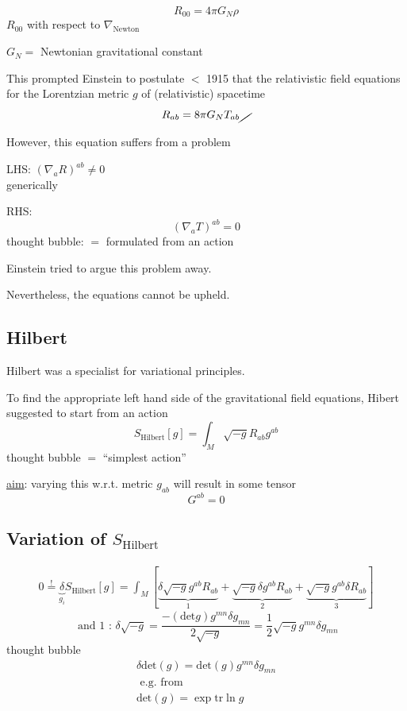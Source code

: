 	\[
	R_{00} = 4\pi G_N \rho
	\]
	$R_{00}$ with respect to $\nabla_{\text{Newton}}$
	
	$G_N = $ Newtonian gravitational constant
	
	This prompted Einstein to postulate $<$ 1915 that the relativistic field equations for the Lorentzian metric $g$ of (relativistic) spacetime
	\[
	R_{ab} = 8\pi G_N T_{ab} \cancel{ \quad }
	\]
	
	However, this equation suffers from a problem
	
	LHS:
	$(\nabla_a R)^{ab} \neq 0$ \\
	generically
	
	RHS:
	\[
	(\nabla_a T)^{ab}  = 0
	\]
	thought bubble: $=$ formulated from an action
	
	Einstein tried to argue this problem away.  
	
	Nevertheless, the equations cannot be upheld. 
	
	\subsection{Hilbert}
	
	Hilbert was a specialist for variational principles. 
	
	To find the appropriate left hand side of the gravitational field equations, Hibert suggested to start from an action
	\[
	S_{\text{Hilbert}}[g] = \int_M \sqrt{-g} R_{ab}g^{ab}
	\]
	thought bubble $=$ ``simplest action''
	
	\underline{aim}: varying this w.r.t. metric $g_{ab}$ will result in some tensor 
	\[
	G^{ab} = 0
	\]
	
	\subsection{Variation of $S_{\text{Hilbert}}$}
	
	\[
	\begin{gathered}
	0 \overset{!}{=} \underbrace{\delta}_{g_i} S_{\text{Hilbert}}[g] = \int_M [ \underbrace{ \delta \sqrt{-g} g^{ab}R_{ab} }_{1} + \underbrace{ \sqrt{-g} \delta g^{ab} R_{ab}}_{2} + \underbrace{ \sqrt{-g} g^{ab} \delta R_{ab} }_{3} ] 
	\end{gathered}
	\]
	\[
	\text{ and 1 : } \delta \sqrt{-g} = \frac{ - (\text{det}g)g^{mn} \delta g_{mn} }{ 2 \sqrt{-g}} = \frac{1}{2} \sqrt{-g} g^{mn} \delta g_{mn}
	\]
	thought bubble
	\[
	\begin{gathered}
	\delta \text{det}(g) = \text{det}(g) g^{mn} \delta g_{mn} \\ 
	\text{ e.g. from } \\
	\text{det}(g) = \exp{ \text{tr}{ \ln{g} } }
	\end{gathered}
	\]
	
